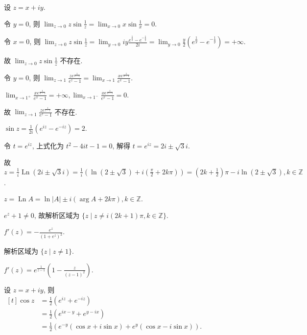 \documentclass{homework}
\DeclareMathOperator\Ln{Ln}
\begin{document}
\maketitle

\begin{center}
\end{center}

设 \(z=x+iy\).

令 \(y=0\), 则 \(\lim_{z\to0}z\sin\frac{1}{z}=\lim_{x\to0}x\sin\frac{1}{x}=0\).

令 \(x=0\), 则 \(\lim_{z\to0}z\sin\frac{1}{z}=\lim_{y\to0}iy\frac{e^{\frac{1}{y}}-e^{-\frac{1}{y}}}{2i}=\lim_{y\to0}\frac{y}{2}(e^{\frac{1}{y}}-e^{-\frac{1}{y}})=+\infty\).

故 \(\lim_{z\to0}z\sin\frac{1}{z}\) 不存在.

令 \(y=0\), 则 \(\lim_{z\to1}\frac{ze^{\frac{1}{z-1}}}{e^z-1}=\lim_{x\to1}\frac{xe^{\frac{1}{x-1}}}{e^x-1}\).

\(\lim_{x\to1^+}\frac{xe^{\frac{1}{x-1}}}{e^x-1}=+\infty, \lim_{x\to1^-}\frac{xe^{\frac{1}{x-1}}}{e^x-1}=0\).

故 \(\lim_{z\to1}\frac{ze^{\frac{1}{z-1}}}{e^z-1}\) 不存在.

\(\sin z=\frac{1}{2i}(e^{iz}-e^{-iz})=2\).

令 \(t=e^{iz}\), 上式化为 \(t^2-4it-1=0\), 解得 \(t=e^{iz}=2i\pm\sqrt{3}i\).

故 \(z=\frac{1}{i}\Ln(2i\pm\sqrt{3}i)=\frac{1}{i}\left(\ln(2\pm\sqrt{3})+i(\frac{\pi}{2}+2k\pi)\right)=(2k+\frac{1}{2})\pi-i\ln(2\pm\sqrt{3}), k\in\mathbb{Z}\).

\(z=\Ln A=\ln|A|\pm i(\arg A+2k\pi), k\in\mathbb{Z}\).

\(e^z+1\neq 0\), 故解析区域为 \(\{z\mid z\neq i(2k+1)\pi, k\in\mathbb{Z}\}\).

\(f'(z)=-\frac{e^z}{(1+e^z)^2}\).

解析区域为 \(\{z\mid z\neq 1\}\).

\(f'(z)=e^{\frac{1}{z-1}}\left(1-\frac{z}{(z-1)^2}\right)\).

设 \(z=x+iy\), 则 \(\begin{aligned}[t]
  \cos z&=\frac{1}{2}(e^{iz}+e^{-iz})\\
  &=\frac{1}{2}(e^{ix-y}+e^{y-ix})\\
  &=\frac{1}{2}\left(e^{-y}(\cos x+i\sin x)+e^y(\cos x-i\sin x)\right).
\end{aligned}\)
\end{document}
